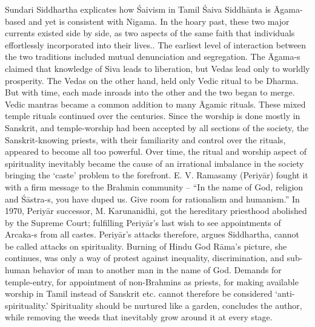 Sundari Siddhartha explicates how Śaivism in Tamil Śaiva Siddhānta is Āgama-based and yet is consistent with Nigama. In the hoary past, these two major currents existed side by side, as two aspects of the same faith that individuals effortlessly incorporated into their lives.. The earliest level of interaction between the two traditions included mutual denunciation and segregation. The Āgama-s claimed that knowledge of Siva leads to liberation, but Vedas lead only to worldly prosperity. The Vedas on the other hand, held only Vedic ritual to be Dharma. But with time, each made inroads into the other and the two began to merge. Vedic mantras became a common addition to many Āgamic rituals. These mixed temple rituals continued over the centuries. Since the worship is done mostly in Sanskrit, and temple-worship had been accepted by all sections of the society, the Sanskrit-knowing priests, with their familiarity and control over the rituals, appeared to become all too powerful. Over time, the ritual and worship aspect of spirituality inevitably became the cause of an irrational imbalance in the society bringing the ‘caste’ problem to the forefront. E. V. Ramasamy (Periyār) fought it with a firm message to the Brahmin community – “In the name of God, religion and Śāstra-s, you have duped us. Give room for rationalism and humanism.” In 1970, Periyār successor, M. Karunanidhi, got the hereditary priesthood abolished by the Supreme Court; fulfilling Periyār’s last wish to see appointments of Arcaka-s from all castes. Periyār’s attacks therefore, argues Siddhartha, cannot be called attacks on spirituality. Burning of Hindu God Rāma’s picture, she continues, was only a way of protest against inequality, discrimination, and sub-human behavior of man to another man in the name of God. Demands for temple-entry, for appointment of non-Brahmins as priests, for making available worship in Tamil instead of Sanskrit etc. cannot therefore be considered ‘anti-spirituality.’ Spirituality should be nurtured like a garden, concludes the author, while removing the weeds that inevitably grow around it at every stage. 

